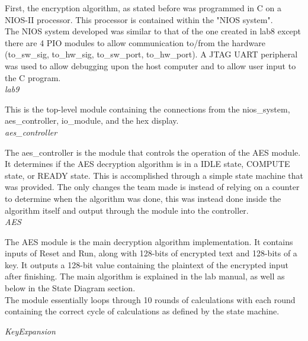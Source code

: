 \documentclass[journal, twocolumn, final,11pt,letterpaper]{IEEEtran}
\begin{document}
First, the encryption algorithm, as stated before was programmed in C on a NIOS-II processor. This processor is contained within the "NIOS system". \\

The NIOS system developed was similar to that of the one created in lab8 except there are 4 PIO modules to allow communication to/from the hardware (to\_sw\_sig, to\_hw\_sig, to\_sw\_port, to\_hw\_port). A JTAG UART peripheral was used to allow debugging upon the host computer and to allow user input to the C program. \\

\textit{lab9}\\
\vspace{-4mm}

This is the top-level module containing the connections from the nios\_system, aes\_controller, io\_module, and the hex display. \\

\textit{aes\_controller}\\
\vspace{-4mm}

The aes\_controller is the module that controls the operation of the AES module. It determines if the AES decryption algorithm is in a IDLE state, COMPUTE state, or READY state. This is accomplished through a simple state machine that was provided. The only changes the team made is instead of relying on a counter to determine when the algorithm was done, this was instead done inside the algorithm itself and output through the module into the controller.\\

\textit{AES}\\
\vspace{-4mm}

The AES module is the main decryption algorithm implementation. It contains inputs of Reset and Run, along with 128-bits of encrypted text and 128-bits of a key. It outputs a 128-bit value containing the plaintext of the encrypted input after finishing. The main algorithm is explained in the lab manual, as well as below in the State Diagram section. \\

The module essentially loops through 10 rounds of calculations with each round containing the correct cycle of calculations as defined by the state machine. 

\textit{KeyExpansion}\\
\vspace{-4mm}
\end{document}
